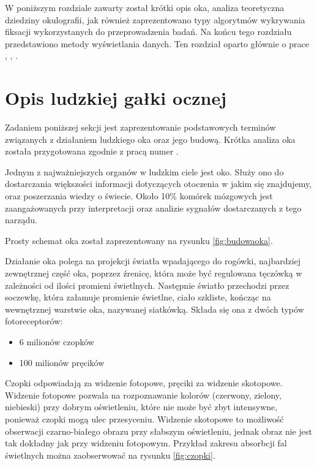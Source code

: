 \label{chapter:ch2}
W poniższym rozdziale zawarty został krótki opis oka, analiza teoretyczna dziedziny okulografii, jak również zaprezentowano typy algorytmów wykrywania fiksacji wykorzystanych do przeprowadzenia badań. Na końcu tego rozdziału przedstawiono metody wyświetlania danych. Ten rozdział oparto głównie o prace \cite{Main}, \cite{EvaluationMethodology}, \cite{MachineLearning}.
\section{Opis ludzkiej gałki ocznej}
Zadaniem poniższej sekcji jest zaprezentowanie podstawowych terminów związanych z działaniem ludzkiego oka oraz jego budową. Krótka analiza oka została przygotowana zgodnie z pracą numer \cite{EvaluationMethodology}.\par
Jednym z najważniejszych organów w ludzkim ciele jest oko. Służy ono do dostarczania większości informacji dotyczących otoczenia w jakim się znajdujemy, oraz poszerzania wiedzy o świecie. Około 10\% komórek mózgowych jest zaangażowanych przy interpretacji oraz analizie sygnałów dostarczanych z tego narządu.\par
Prosty schemat oka został zaprezentowany na rysunku \ref{fig:budowaoka}.\par
Działanie oka polega na projekcji światła wpadającego do rogówki, najbardziej zewnętrznej część oka, poprzez źrenicę, która może być regulowana tęczówką w zależności od ilości promieni świetlnych. Następnie światło przechodzi przez soczewkę, która załamuje promienie świetlne, ciało szkliste, kończąc na wewnętrznej warstwie oka, nazywanej siatkówką. Składa się ona z dwóch typów fotoreceptorów:
    \begin{itemize}
        \item 6 milionów czopków
        \item 100 milionów pręcików
    \end{itemize} 
Czopki odpowiadają za widzenie fotopowe, pręciki za widzenie skotopowe. Widzenie fotopowe pozwala na rozpoznawanie kolorów (czerwony, zielony, niebieski) przy dobrym oświetleniu, które nie może być zbyt intensywne, ponieważ czopki mogą ulec przesyceniu. Widzenie skotopowe to możliwość obserwacji czarno-białego obrazu przy słabszym oświetleniu, jednak obraz nie jest tak dokładny jak przy widzeniu fotopowym. Przykład zakresu absorbcji fal świetlnych można zaobserwować na rysunku \ref{fig:czopki}.

